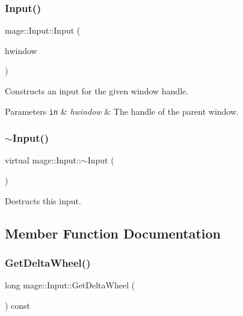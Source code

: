\subsubsection{\texorpdfstring{Input()}{Input()}}
{\footnotesize\ttfamily mage\+::\+Input\+::\+Input (\begin{DoxyParamCaption}\item[{H\+W\+ND}]{hwindow }\end{DoxyParamCaption})}

Constructs an input for the given window handle.


\begin{DoxyParams}[1]{Parameters}
\mbox{\tt in}  & {\em hwindow} & The handle of the parent window. \\
\hline
\end{DoxyParams}
\hypertarget{classmage_1_1_input_a52324bfe97e7245176f77ac9e635df53}{}\label{classmage_1_1_input_a52324bfe97e7245176f77ac9e635df53} 
\subsubsection{\texorpdfstring{$\sim$\+Input()}{~Input()}}
{\footnotesize\ttfamily virtual mage\+::\+Input\+::$\sim$\+Input (\begin{DoxyParamCaption}{ }\end{DoxyParamCaption})\hspace{0.3cm}{\ttfamily [virtual]}}

Destructs this input. 

\subsection{Member Function Documentation}
\hypertarget{classmage_1_1_input_a59c042bc18b47bca3010eb4df7de44c2}{}\label{classmage_1_1_input_a59c042bc18b47bca3010eb4df7de44c2} 
\subsubsection{\texorpdfstring{Get\+Delta\+Wheel()}{GetDeltaWheel()}}
{\footnotesize\ttfamily long mage\+::\+Input\+::\+Get\+Delta\+Wheel (\begin{DoxyParamCaption}{ }\end{DoxyParamCaption}) const}

